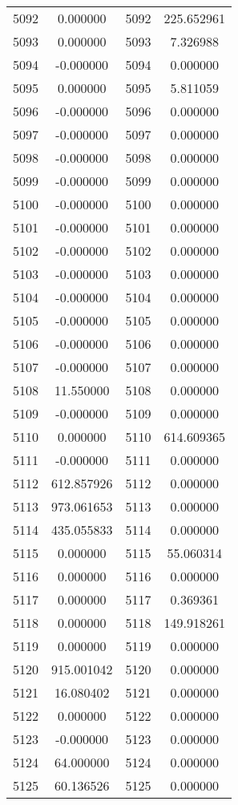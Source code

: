 \documentclass[12pt]{article}
\begin{document}
\begin{longtable}{@{}cccc@{}}
5092 & 0.000000 & 5092 & 225.652961 \\
5093 & 0.000000 & 5093 & 7.326988 \\
5094 & -0.000000 & 5094 & 0.000000 \\
5095 & 0.000000 & 5095 & 5.811059 \\
5096 & -0.000000 & 5096 & 0.000000 \\
5097 & -0.000000 & 5097 & 0.000000 \\
5098 & -0.000000 & 5098 & 0.000000 \\
5099 & -0.000000 & 5099 & 0.000000 \\
5100 & -0.000000 & 5100 & 0.000000 \\
5101 & -0.000000 & 5101 & 0.000000 \\
5102 & -0.000000 & 5102 & 0.000000 \\
5103 & -0.000000 & 5103 & 0.000000 \\
5104 & -0.000000 & 5104 & 0.000000 \\
5105 & -0.000000 & 5105 & 0.000000 \\
5106 & -0.000000 & 5106 & 0.000000 \\
5107 & -0.000000 & 5107 & 0.000000 \\
5108 & 11.550000 & 5108 & 0.000000 \\
5109 & -0.000000 & 5109 & 0.000000 \\
5110 & 0.000000 & 5110 & 614.609365 \\
5111 & -0.000000 & 5111 & 0.000000 \\
5112 & 612.857926 & 5112 & 0.000000 \\
5113 & 973.061653 & 5113 & 0.000000 \\
5114 & 435.055833 & 5114 & 0.000000 \\
5115 & 0.000000 & 5115 & 55.060314 \\
5116 & 0.000000 & 5116 & 0.000000 \\
5117 & 0.000000 & 5117 & 0.369361 \\
5118 & 0.000000 & 5118 & 149.918261 \\
5119 & 0.000000 & 5119 & 0.000000 \\
5120 & 915.001042 & 5120 & 0.000000 \\
5121 & 16.080402 & 5121 & 0.000000 \\
5122 & 0.000000 & 5122 & 0.000000 \\
5123 & -0.000000 & 5123 & 0.000000 \\
5124 & 64.000000 & 5124 & 0.000000 \\
5125 & 60.136526 & 5125 & 0.000000 \\

\end{longtable}
\end{document}
